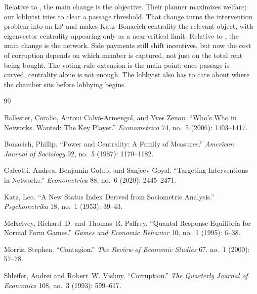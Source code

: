 \documentclass[11pt,letterpaper]{article}
\theoremstyle{plain}
\theoremstyle{definition}
\theoremstyle{remark}
\begin{document}
Relative to \citet{ggg2020}, the main change is the objective. Their planner maximizes welfare; our lobbyist tries to clear a passage threshold. That change turns the intervention problem into an LP and makes Katz--Bonacich centrality the relevant object, with eigenvector centrality appearing only as a near-critical limit. Relative to \citet{shleifer1993}, the main change is the network. Side payments still shift incentives, but now the cost of corruption depends on which member is captured, not just on the total rent being bought. The voting-rule extension is the main point: once passage is curved, centrality alone is not enough. The lobbyist also has to care about where the chamber sits before lobbying begins.


\begin{thebibliography}{99}

Ballester, Coralio, Antoni Calv\'o-Armengol, and Yves Zenou. ``Who's Who in Networks. Wanted: The Key Player.'' \textit{Econometrica} 74, no.~5 (2006): 1403--1417.

Bonacich, Phillip. ``Power and Centrality: A Family of Measures.'' \textit{American Journal of Sociology} 92, no.~5 (1987): 1170--1182.

Galeotti, Andrea, Benjamin Golub, and Sanjeev Goyal. ``Targeting Interventions in Networks.'' \textit{Econometrica} 88, no.~6 (2020): 2445--2471.

Katz, Leo. ``A New Status Index Derived from Sociometric Analysis.'' \textit{Psychometrika} 18, no.~1 (1953): 39--43.

McKelvey, Richard~D. and Thomas~R. Palfrey. ``Quantal Response Equilibria for Normal Form Games.'' \textit{Games and Economic Behavior} 10, no.~1 (1995): 6--38.

Morris, Stephen. ``Contagion.'' \textit{The Review of Economic Studies} 67, no.~1 (2000): 57--78.

Shleifer, Andrei and Robert~W. Vishny. ``Corruption.'' \textit{The Quarterly Journal of Economics} 108, no.~3 (1993): 599--617.

\end{thebibliography}
\end{document}
